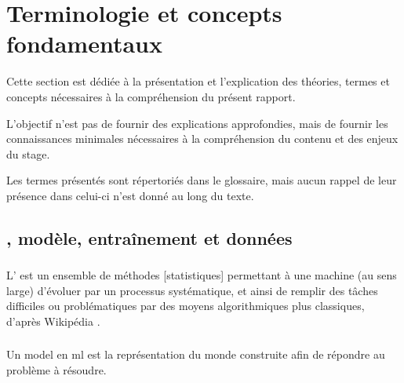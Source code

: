 \chapter{Terminologie et concepts fondamentaux}
Cette section est dédiée à la présentation et l'explication des théories, termes et concepts nécessaires à la compréhension du présent rapport.

L'objectif n'est pas de fournir des explications approfondies, mais de fournir les connaissances minimales nécessaires à la compréhension du contenu et des enjeux du stage.

Les termes présentés sont répertoriés dans le glossaire, mais aucun rappel de leur présence dans celui-ci n'est donné au long du texte.

\section{, modèle, entraînement et données}

\subsection{}
\label{subsec:ml} \label{def:ml}
L' est un ensemble de \og méthodes [statistiques] permettant à une machine (au sens large) d'évoluer par un processus systématique, et ainsi de remplir des tâches difficiles ou problématiques par des moyens algorithmiques plus classiques\fg{}, d'après Wikipédia \autocite{wiki_ml}.

\subsection{} \label{def:model}
Un \gls{model} en \gls{ml} est la représentation du monde construite afin de répondre au problème à résoudre.

